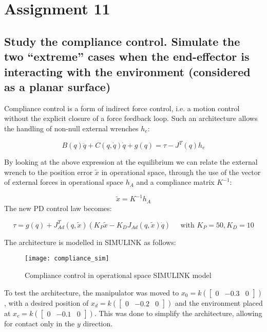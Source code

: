 \section{Assignment 11}

\subsection{Study the compliance control. Simulate the two “extreme” cases when the end-effector is interacting with the environment (considered as a planar surface)}

Compliance control is a form of indirect force control, i.e. a motion control without the explicit closure of a force feedback loop. Such an architecture allows the handling of non-null external wrenches $h_e$:

\begin{equation*}
B(q)\ddot q + C(q,\dot q)\dot q + g(q) = \tau -J^T(q)h_e
\end{equation*}

By looking at the above expression at the equilibrium we can relate the external wrench to the position error $\tilde x$ in operational space, through the use of the vector of external forces in operational space $h_A$ and a compliance matrix $K^{-1}$:

\begin{equation*}
\tilde x = K^{-1}h_A
\end{equation*}
The new PD control law becomes:

\begin{equation*}
\tau = g(q) + J_{Ad}^T(q,\tilde x)(K_P\tilde x-K_DJ_{Ad}(q,\tilde x)\dot q)\;\;\;\;\;\text{with }K_P=50,K_D=10
\end{equation*}

The architecture is modelled in SIMULINK as follows:

\begin{figure}[H]
\centering
\texttt{[image: compliance\_sim]}
\caption{Compliance control in operational space SIMULINK model}
\end{figure}

To test the architecture, the manipulator was moved to $x_0=k(\begin{bmatrix}
0&-0.3&0
\end{bmatrix})$, with a desired position of $x_d=k(\begin{bmatrix}
0&-0.2&0
\end{bmatrix})$ and the environment placed at $x_e=k(\begin{bmatrix}
0&-0.1&0
\end{bmatrix})$. This was done to simplify the architecture, allowing for contact only in the $y$ direction.

